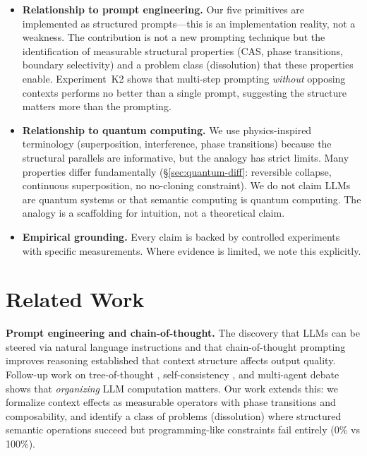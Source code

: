 \documentclass[11pt,a4paper]{article}
\begin{document}
\begin{itemize}[leftmargin=*]
\item \textbf{Relationship to prompt engineering.} Our five primitives are implemented as structured prompts---this is an implementation reality, not a weakness. The contribution is not a new prompting technique but the identification of measurable structural properties (CAS, phase transitions, boundary selectivity) and a problem class (dissolution) that these properties enable. Experiment~K2 shows that multi-step prompting \emph{without} opposing contexts performs no better than a single prompt, suggesting the structure matters more than the prompting.

\item \textbf{Relationship to quantum computing.} We use physics-inspired terminology (superposition, interference, phase transitions) because the structural parallels are informative, but the analogy has strict limits. Many properties differ fundamentally (\S\ref{sec:quantum-diff}: reversible collapse, continuous superposition, no no-cloning constraint). We do not claim LLMs are quantum systems or that semantic computing is quantum computing. The analogy is a scaffolding for intuition, not a theoretical claim.

\item \textbf{Empirical grounding.} Every claim is backed by controlled experiments with specific measurements. Where evidence is limited, we note this explicitly.
\end{itemize}

\section{Related Work}

\textbf{Prompt engineering and chain-of-thought.} The discovery that LLMs can be steered via natural language instructions \citep{brown2020language} and that chain-of-thought prompting improves reasoning \citep{wei2022chain} established that context structure affects output quality. Follow-up work on tree-of-thought \citep{yao2023tree}, self-consistency \citep{wang2023self}, and multi-agent debate \citep{du2023improving,liang2023encouraging} shows that \emph{organizing} LLM computation matters. Our work extends this: we formalize context effects as measurable operators with phase transitions and composability, and identify a class of problems (dissolution) where structured semantic operations succeed but programming-like constraints fail entirely (0\% vs 100\%).
\end{document}

